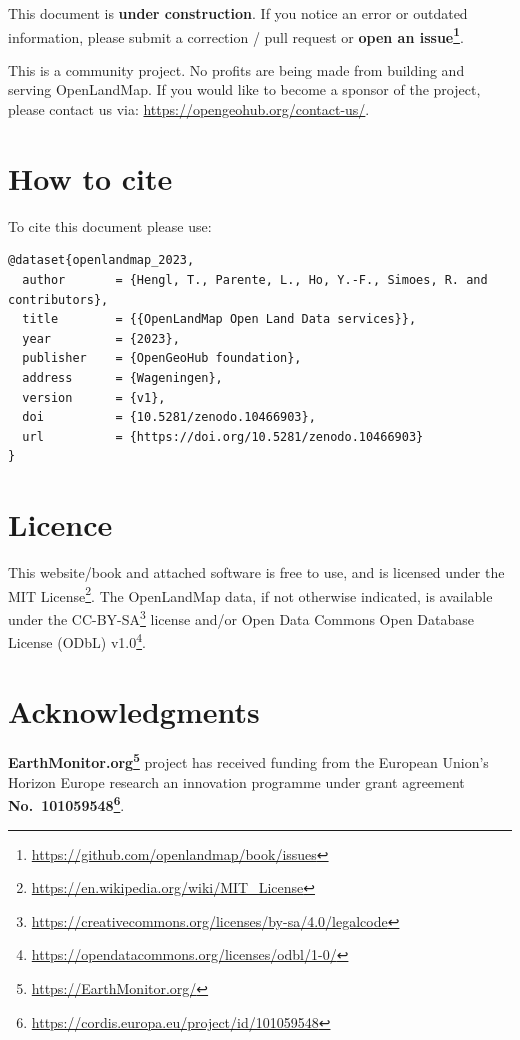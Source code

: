 \documentclass[
  graybox,natbib,nospthms]{svmono}
\renewcommand{\href}[2]{#2 (\url{#1})}
\renewcommand{\href}[2]{#2\footnote{\url{#1}}}
\begin{document}
This document is \textbf{under construction}. If you notice an error or outdated information,
please submit a correction / pull request or \textbf{\href{https://github.com/openlandmap/book/issues}{open an issue}}.

This is a community project. No profits are being made from building and serving
OpenLandMap. If you would like to become a sponsor of the project, please
contact us via: \url{https://opengeohub.org/contact-us/}.

\hypertarget{how-to-cite}{%
\section*{How to cite}\label{how-to-cite}}

To cite this document please use:

\begin{verbatim}
@dataset{openlandmap_2023,
  author       = {Hengl, T., Parente, L., Ho, Y.-F., Simoes, R. and contributors},
  title        = {{OpenLandMap Open Land Data services}},
  year         = {2023},
  publisher    = {OpenGeoHub foundation},
  address      = {Wageningen},
  version      = {v1},
  doi          = {10.5281/zenodo.10466903},
  url          = {https://doi.org/10.5281/zenodo.10466903}
}
\end{verbatim}

\hypertarget{licence}{%
\section*{Licence}\label{licence}}

This website/book and attached software is free to use, and is licensed under \href{https://en.wikipedia.org/wiki/MIT_License}{the MIT License}. The OpenLandMap data,
if not otherwise indicated, is available under the \href{https://creativecommons.org/licenses/by-sa/4.0/legalcode}{CC-BY-SA} license and/or \href{https://opendatacommons.org/licenses/odbl/1-0/}{Open Data Commons Open Database License (ODbL) v1.0}.

\hypertarget{acknowledgments}{%
\section*{Acknowledgments}\label{acknowledgments}}

\textbf{\href{https://EarthMonitor.org/}{EarthMonitor.org}} project has received funding from the European Union's Horizon Europe research an innovation programme under grant agreement \textbf{\href{https://cordis.europa.eu/project/id/101059548}{No.~101059548}}.
\end{document}
